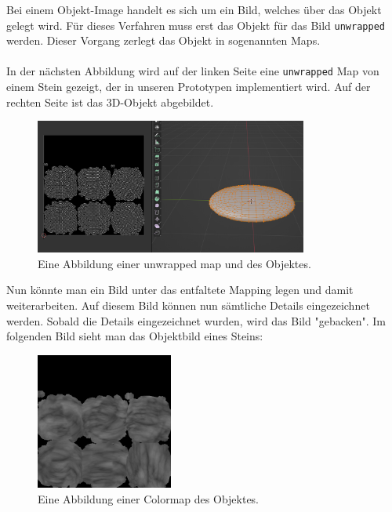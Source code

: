 Bei einem Objekt-Image handelt es sich um ein Bild, welches über das Objekt gelegt wird. Für dieses Verfahren muss erst das Objekt für das Bild \verb+unwrapped+ werden. Dieser Vorgang zerlegt das Objekt in sogenannten Maps.\\\\
In der nächsten Abbildung wird auf der linken Seite eine \verb+unwrapped+ Map von einem Stein gezeigt, der in unseren Prototypen implementiert wird. Auf der rechten Seite ist das 3D-Objekt abgebildet.


\begin{figure}[H]
    \centering
    \includegraphics[width=0.8\textwidth]{chapters/11/Images/StoneAndUnwrap.png}
    \caption{Eine Abbildung einer unwrapped map und des Objektes.}
    \label{htl01}
\end{figure}

\noindent Nun könnte man ein Bild unter das entfaltete Mapping legen und damit weiterarbeiten. Auf diesem Bild können nun sämtliche Details eingezeichnet werden. Sobald die Details eingezeichnet wurden, wird das Bild "gebacken". Im folgenden Bild sieht man das Objektbild eines Steins: %

\begin{figure}[H]
    \centering
    \includegraphics[width=0.4\textwidth]{chapters/11/Images/SteinColor.png}
    \caption{Eine Abbildung einer Colormap des Objektes.}
    \label{htl01}
\end{figure}

